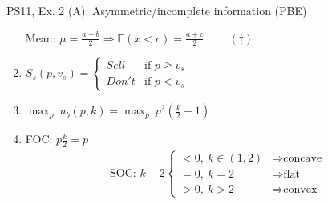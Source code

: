 \begin{frame}{PS11, Ex. 2 (A): Asymmetric/incomplete information (PBE)}
\begin{multicols}{2}
\begin{enumerate}
        \item[Mean:] \vspace{-2pt}  $\mu=\frac{a+b}{2}\Rightarrow\mathbb{E}(x<c)=\frac{a+c}{2}\quad\quad\ (\ddagger)$
        \item \vspace{-2pt} $S_s(p,v_s)=\left\{\begin{array}{ll}
          Sell  & \text{if }p\geq v_s \\
          Don't & \text{if }p < v_s
        \end{array}\right.$
        \item \vspace{-2pt} $\displaystyle{\max_p}\ u_b(p,k)=\displaystyle{\max_p}\ p^2\left(\frac{k}{2}-1\right)$
        \item \vspace{-2pt} FOC: $p\frac{k}{2}=p$\vspace{-6pt}
        \begin{align*}
          \text{SOC: }k-2\left\{\begin{array}{ll}
              <0,\ k\in(1,2)&\Rightarrow\text{concave}\\
              =0,\ k=2&\Rightarrow\text{flat}\\
              >0,\ k>2&\Rightarrow\text{convex}
          \end{array}\right.
        \end{align*}
      \end{enumerate}
      \vfill\null
    \end{multicols}
\end{frame}
